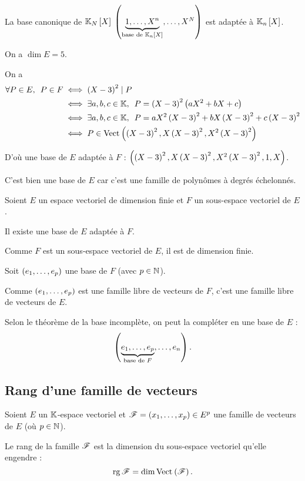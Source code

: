 \begin{corr}[1]
La base canonique de \(\polydeg{N}\) \(\paren{\underbrace{1,\dots,X^n}_{\text{base de }\polydeg{n}},\dots,X^N}\) est adaptée à \(\polydeg{n}\).
\end{corr}

\begin{corr}[2]
On a \(\dim E=5\).

On a \[\begin{aligned}
\quantifs{\forall P\in E}P\in F&\ssi\paren{X-3}^2\divise P \\
&\ssi\quantifs{\exists a,b,c\in\K}P=\paren{X-3}^2\paren{aX^2+bX+c} \\
&\ssi\quantifs{\exists a,b,c\in\K}P=aX^2\paren{X-3}^2+bX\paren{X-3}^2+c\paren{X-3}^2 \\
&\ssi P\in\Vect{\paren{X-3}^2,X\paren{X-3}^2,X^2\paren{X-3}^2}
\end{aligned}\]

D'où une base de \(E\) adaptée à \(F\) : \(\left(\left(X-3\right)^2,X\left(X-3\right)^2,X^2\left(X-3\right)^2,1,X\right)\).

C'est bien une base de \(E\) car c'est une famille de polynômes à degrés échelonnés.
\end{corr}

\begin{prop}
Soient \(E\) un espace vectoriel de dimension finie et \(F\) un sous-espace vectoriel de \(E\).

Il existe une base de \(E\) adaptée à \(F\).
\end{prop}

\begin{dem}
Comme \(F\) est un sous-espace vectoriel de \(E\), il est de dimension finie.

Soit \(\left(e_1,\dots,e_p\right)\) une base de \(F\) (avec \(p\in\mathbb{N}\)).

Comme \(\left(e_1,\dots,e_p\right)\) est une famille libre de vecteurs de \(F\), c'est une famille libre de vecteurs de \(E\).

Selon le théorème de la base incomplète, on peut la compléter en une base de \(E\) : \[\left(\underbrace{e_1,\dots,e_p}_{\text{base de }F},\dots,e_n\right).\]
\end{dem}

\subsection{Rang d'une famille de vecteurs}

\begin{defi}
Soient \(E\) un \(\mathbb{K}\)-espace vectoriel et \(\mathscr{F}=\left(x_1,\dots,x_p\right)\in E^p\) une famille de vecteurs de \(E\) (où \(p\in\mathbb{N}\)).

Le rang de la famille \(\mathscr{F}\) est la dimension du sous-espace vectoriel qu'elle engendre : \[\rg\fami{F}=\dim\Vect{\fami{F}}.\]
\end{defi}

